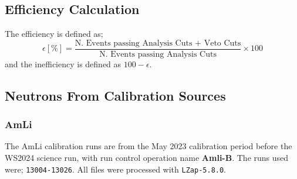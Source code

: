 \subsection{Efficiency Calculation}
The efficiency is defined as;
\begin{equation}
	\epsilon [\%] = \frac{\textrm{N. Events passing Analysis Cuts + Veto Cuts}}{\textrm{N. Events passing Analysis Cuts}} \times 100
	\label{eq:neutron_tagging_efficiency}
\end{equation}
and the inefficiency is defined as $100 - \epsilon$.

\subsection{Neutrons From Calibration Sources \label{sec:AmLi_Efficiency}}
\subsubsection{AmLi}
The AmLi calibration runs are from the May 2023 calibration period before the WS2024 science run, with run control operation name \textbf{Amli-B}.
The runs used were; \lstinline{13004-13026}.
All files were processed with \lstinline{LZap-5.8.0}.


